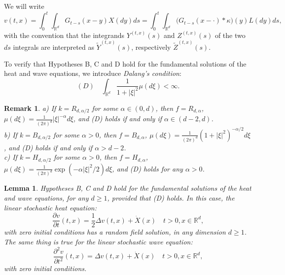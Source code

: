 \documentclass[12pt]{article}
\newtheorem{lemma}[theorem]{Lemma}
\newtheorem{remark}[theorem]{Remark}
\def\bR{\mathbb{R}}
\def\k{\kappa}
\begin{document}
We will write
\begin{equation}
\label{def-v}
v(t,x)=\int_0^t \int_{\bR^d}G_{t-s}(x-y)X(dy)ds=\int_0^t \int_{\bR^d}\big( G_{t-s}(x-\cdot)*\k \big)(y) L(dy)ds,
\end{equation}
with the convention that the integrands $Y^{(t,x)}(s)$ and $Z^{(t,x)}(s)$ of the two $ds$ integrals are interpreted as $\widetilde{Y}^{(t,x)}(s)$, respectively $\widetilde{Z}^{(t,x)}(s)$.

\medskip

To verify that Hypotheses B, C and D hold for the fundamental solutions of the heat and wave equations,
we introduce {\em Dalang's condition}:
\[
(D) \quad \int_{\bR^d} \frac{1}{1+|\xi|^2}\mu(d\xi)<\infty.
\]

\begin{remark}
{\rm
a) If $k=R_{d,\alpha/2}$ for some $\alpha \in (0,d)$, then $f=R_{d,\alpha}$, $\mu(d\xi)=\frac{1}{(2\pi)^{d}} |\xi|^{-\alpha}d\xi$, and (D) holds if and only if
$\alpha \in (d-2,d)$.\\
b) If $k=B_{d,\alpha/2}$ for some $\alpha >0$, then $f=B_{d,\alpha}$, $\mu(d\xi)=\frac{1}{(2\pi)^{d}} (1+|\xi|^{2})^{-\alpha/2}d\xi$, and (D) holds if and only if
$\alpha >d-2$.\\
c) If $k=H_{d,\alpha/2}$ for some $\alpha >0$, then $f=H_{d,\alpha}$, $\mu(d\xi)=\frac{1}{(2\pi)^{d}} \exp(-\alpha|\xi|^2/2)d\xi$, and (D) holds for any $\alpha >0$.
}
\end{remark}


\begin{lemma}
\label{lem-add}
 Hypotheses B, C and D hold for the fundamental solutions of the heat and wave equations, for any $d\geq 1$, provided that (D) holds. In this case, the linear stochastic heat equation:
\begin{equation}
\label{heat-add}
\frac{\partial v}{\partial t}(t,x)=\frac{1}{2}\Delta v(t,x)+\dot{X}(x) \quad t>0,x\in \bR^d,
\end{equation}
with zero initial conditions has a random field solution, in any dimension $d\geq 1$. The same thing is true for the linear  stochastic wave equation:
\begin{equation}
\label{wave-add}
\frac{\partial^2 v}{\partial t^2}(t,x)=\Delta v(t,x)+\dot{X}(x) \quad t>0,x\in \bR^d,
\end{equation}
with zero initial conditions.
\end{lemma}
\end{document}
